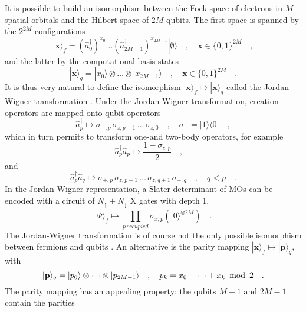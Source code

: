 \documentclass{article}
\newcommand{\pos}[1]{\mathbf{#1}}
\newcommand{\CRE}[1]{\hat{a}^\dagger_{#1}}
\newcommand{\DIS}[1]{\hat{a}^{\phantom{\dagger}}_{#1}}
\begin{document}
It is possible to build an isomorphism between the Fock space of electrons in $M$ spatial orbitals and
the Hilbert space of $2M$ qubits. The first space is spanned by the $2^{2M}$ configurations
\begin{equation}
| \pos{x} \rangle_f = \left(\CRE{0}\right)^{x_0} \dots \left(\CRE{2M-1}\right)^{x_{2M-1}} | \emptyset \rangle 
\quad,\quad 
\pos{x} \in \{0,1\}^{2M}
\quad,
\end{equation}
and the latter by the computational basis states
\begin{equation}
| \pos{x} \rangle_q = | x_0 \rangle \otimes \dots \otimes | x_{2M-1} \rangle
\quad,\quad 
\pos{x} \in \{0,1\}^{2M}
\quad.
\end{equation}
It is thus very natural to define the isomorphism $| \pos{x} \rangle_f \mapsto | \pos{x} \rangle_q$ called the Jordan-Wigner transformation \cite{tranter2015b}. 
Under the Jordan-Wigner transformation, creation operators are mapped onto qubit operators
\begin{equation}
\CRE{p} \mapsto \sigma_{+,p} \, \sigma_{z,p-1} \, \dots \, \sigma_{z,0} 
\quad,\quad
\sigma_+ = |1 \rangle \langle 0 |
\quad,
\end{equation}
which in turn permits to transform one-and two-body operators, for example
\begin{equation}
\CRE{p} \DIS{p} \mapsto \frac{1 - \sigma_{z,p}}{2} 
\quad,\quad
\end{equation}
and
\begin{equation}
\CRE{p} \DIS{q} \mapsto \sigma_{+,p} \, \sigma_{z,p-1} \, \dots \, \sigma_{z,q+1} \, \sigma_{+,q}
\quad,\quad q<p 
\quad.
\end{equation}
In the Jordan-Wigner representation, a Slater determinant of MOs can be encoded with a circuit of $N_\uparrow + N_\downarrow$ X gates with depth 1,
\begin{equation}
| \Psi \rangle_f \mapsto \prod_{p \, {occupied}} \sigma_{x,p} \left( | 0 \rangle^{\otimes 2M} \right) \quad.
\end{equation}
The Jordan-Wigner transformation is of course not the only possible isomorphism between fermions and qubits \cite{bravyi2002fermionic}. 
An alternative is the parity mapping $| \pos{x} \rangle_f \mapsto | \pos{p} \rangle_q$, with
\begin{equation}
| \pos{p} \rangle_q = | p_0 \rangle \otimes \dots \otimes | p_{2M-1} \rangle
\quad,\quad
p_k = x_0 + \dots + x_{k} \mbox{\, mod \,} 2
\quad.
\end{equation}
The parity mapping has an appealing property: the qubits $M-1$ and $2M-1$ contain the parities
\end{document}
